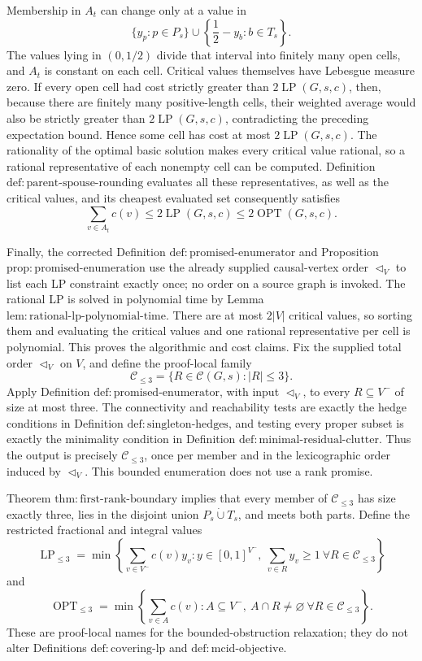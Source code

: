 Membership in \(A_t\) can change only at a value in
\[
 \{y_p:p\in P_s\}\cup
 \left\{\frac12-y_b:b\in T_s\right\}.
\]
The values lying in \((0,1/2)\) divide that interval into finitely many open cells, and \(A_t\) is constant on each cell.  Critical values themselves have Lebesgue measure zero.  If every open cell had cost strictly greater than \(2\operatorname{LP}(G,s,c)\), then, because there are finitely many positive-length cells, their weighted average would also be strictly greater than \(2\operatorname{LP}(G,s,c)\), contradicting the preceding expectation bound.  Hence some cell has cost at most \(2\operatorname{LP}(G,s,c)\).  The rationality of the optimal basic solution makes every critical value rational, so a rational representative of each nonempty cell can be computed.  Definition \(\mathrm{def{:}parent\mbox{-}spouse\mbox{-}rounding}\) evaluates all these representatives, as well as the critical values, and its cheapest evaluated set consequently satisfies
\[
 \sum_{v\in A_t}c(v)
 \leq2\operatorname{LP}(G,s,c)
 \leq2\operatorname{OPT}(G,s,c).
\]

Finally, the corrected Definition \(\mathrm{def{:}promised\mbox{-}enumerator}\) and Proposition \(\mathrm{prop{:}promised\mbox{-}enumeration}\) use the already supplied causal-vertex order \(\triangleleft_V\) to list each LP constraint exactly once; no order on a source graph is invoked.  The rational LP is solved in polynomial time by Lemma \(\mathrm{lem{:}rational\mbox{-}lp\mbox{-}polynomial\mbox{-}time}\).  There are at most \(2|V|\) critical values, so sorting them and evaluating the critical values and one rational representative per cell is polynomial.  This proves the algorithmic and cost claims.
Fix the supplied total order \(\triangleleft_V\) on \(V\), and define the proof-local family
\[
 \mathcal C_{\leq3}=\{R\in\mathcal C(G,s):|R|\leq3\}.
\]
Apply Definition \(\mathrm{def{:}promised\mbox{-}enumerator}\), with input \(\triangleleft_V\), to every \(R\subseteq V^{-}\) of size at most three.  The connectivity and reachability tests are exactly the hedge conditions in Definition \(\mathrm{def{:}singleton\mbox{-}hedges}\), and testing every proper subset is exactly the minimality condition in Definition \(\mathrm{def{:}minimal\mbox{-}residual\mbox{-}clutter}\).  Thus the output is precisely \(\mathcal C_{\leq3}\), once per member and in the lexicographic order induced by \(\triangleleft_V\).  This bounded enumeration does not use a rank promise.

Theorem \(\mathrm{thm{:}first\mbox{-}rank\mbox{-}boundary}\) implies that every member of \(\mathcal C_{\leq3}\) has size exactly three, lies in the disjoint union \(P_s\mathbin{\dot\cup}T_s\), and meets both parts.  Define the restricted fractional and integral values
\[
 \operatorname{LP}_{\leq3}
 =\min\left\{\sum_{v\in V^{-}}c(v)y_v:
 y\in[0,1]^{V^{-}},\ 
 \sum_{v\in R}y_v\geq1\ \forall R\in\mathcal C_{\leq3}\right\}
\]
and
\[
 \operatorname{OPT}_{\leq3}
 =\min\left\{\sum_{v\in A}c(v):
 A\subseteq V^{-},\ A\cap R\neq\varnothing\ \forall R\in\mathcal C_{\leq3}\right\}.
\]
These are proof-local names for the bounded-obstruction relaxation; they do not alter Definitions \(\mathrm{def{:}covering\mbox{-}lp}\) and \(\mathrm{def{:}mcid\mbox{-}objective}\).

